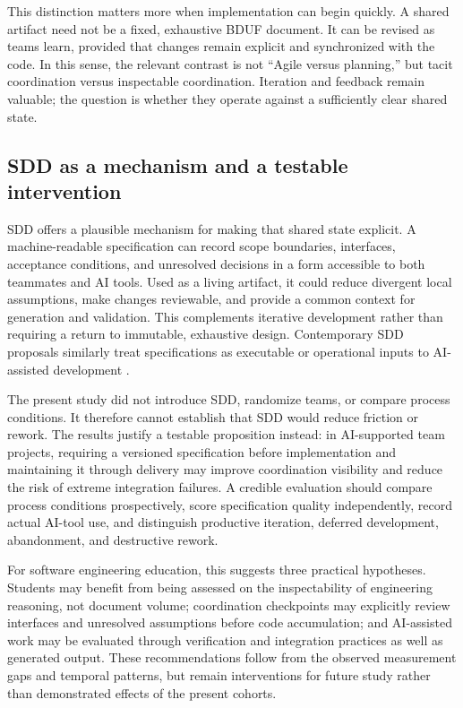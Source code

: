 \documentclass[conference]{IEEEtran}
\begin{document}
This distinction matters more when implementation can begin quickly. A shared
artifact need not be a fixed, exhaustive BDUF document. It can be revised as
teams learn, provided that changes remain explicit and synchronized with the
code. In this sense, the relevant contrast is not ``Agile versus planning,''
but tacit coordination versus inspectable coordination. Iteration and feedback
remain valuable; the question is whether they operate against a sufficiently
clear shared state.

\subsection{SDD as a mechanism and a testable intervention}

SDD offers a plausible mechanism for making that shared state explicit. A
machine-readable specification can record scope boundaries, interfaces,
acceptance conditions, and unresolved decisions in a form accessible to both
teammates and AI tools. Used as a living artifact, it could reduce divergent
local assumptions, make changes reviewable, and provide a common context for
generation and validation. This complements iterative development rather than
requiring a return to immutable, exhaustive design. Contemporary SDD proposals
similarly treat specifications as executable or operational inputs to
AI-assisted development \cite{github2025spec,thoughtworks202Xspec}.

The present study did not introduce SDD, randomize teams, or compare process
conditions. It therefore cannot establish that SDD would reduce friction or
rework. The results justify a testable proposition instead: in AI-supported
team projects, requiring a versioned specification before implementation and
maintaining it through delivery may improve coordination visibility and reduce
the risk of extreme integration failures. A credible evaluation should compare
process conditions prospectively, score specification quality independently,
record actual AI-tool use, and distinguish productive iteration, deferred
development, abandonment, and destructive rework.

For software engineering education, this suggests three practical hypotheses.
Students may benefit from being assessed on the inspectability of engineering
reasoning, not document volume; coordination checkpoints may explicitly review
interfaces and unresolved assumptions before code accumulation; and AI-assisted
work may be evaluated through verification and integration practices as well as
generated output. These recommendations follow from the observed measurement
gaps and temporal patterns, but remain interventions for future study rather
than demonstrated effects of the present cohorts.
\end{document}
